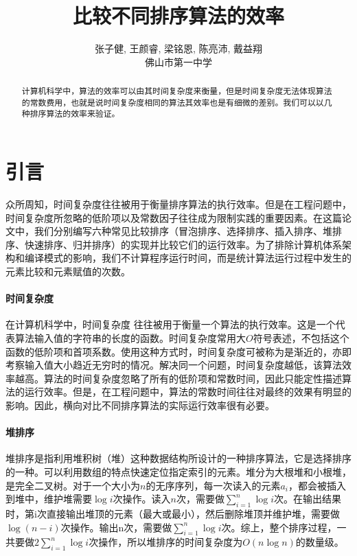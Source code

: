 \documentclass[UTF8]{ctexart}
\title{比较不同排序算法的效率}
\author{张子健, 王颜睿, 梁铭恩, 陈亮沛, 戴益翔 \\ 佛山市第一中学}
\begin{document}
\maketitle
\begin{abstract}

计算机科学中，算法的效率可以由其时间复杂度来衡量，但是时间复杂度无法体现算法的常数费用，也就是说时间复杂度相同的算法其效率也是有细微的差别。我们可以以几种排序算法的效率来验证。

\end{abstract}

\section{引言}

众所周知，时间复杂度往往被用于衡量排序算法的执行效率。但是在工程问题中，时间复杂度所忽略的低阶项以及常数因子往往成为限制实践的重要因素。在这篇论文中，我们分别编写六种常见比较排序（冒泡排序、选择排序、插入排序、堆排序、快速排序、归并排序）的实现并比较它们的运行效率。为了排除计算机体系架构和编译模式的影响，我们不计算程序运行时间，而是统计算法运行过程中发生的元素比较和元素赋值的次数。

\paragraph{时间复杂度}
在计算机科学中，时间复杂度 \cite{cormen1990introduction} 往往被用于衡量一个算法的执行效率。这是一个代表算法输入值的字符串的长度的函数。时间复杂度常用大$O$符号表述，不包括这个函数的低阶项和首项系数。使用这种方式时，时间复杂度可被称为是渐近的，亦即考察输入值大小趋近无穷时的情况。解决同一个问题，时间复杂度越低，该算法效率越高。算法的时间复杂度忽略了所有的低阶项和常数时间，因此只能定性描述算法的运行效率。但是，在工程问题中，算法的常数时间往往对最终的效果有明显的影响。因此，横向对比不同排序算法的实际运行效率很有必要。

\paragraph{堆排序}
堆排序\cite{cormen1990introduction}是指利用堆积树（堆）这种数据结构所设计的一种排序算法，它是选择排序的一种。可以利用数组的特点快速定位指定索引的元素。堆分为大根堆和小根堆，是完全二叉树。对于一个大小为$n$的无序序列，每一次读入的元素$a_i$，都会被插入到堆中，维护堆需要$\log i$次操作。读入$n$次，需要做$\sum_{i=1}^{n}\log i$次。在输出结果时，第i次直接输出堆顶的元素（最大或最小），然后删除堆顶并维护堆，需要做$\log (n-i)$次操作。输出n次，需要做$\sum_{i=1}^{n}\log i$次。综上，整个排序过程，一共要做$2\sum_{i=1}^{n}\log i$次操作，所以堆排序的时间复杂度为$O(n \log n)$的数量级。
\end{document}
